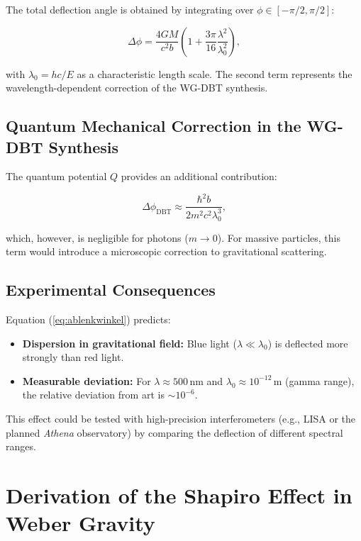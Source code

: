 The total deflection angle is obtained by integrating over $\phi \in [-\pi/2, \pi/2]$:

\begin{equation}
    \label{eq:ablenkwinkel}
    \boxed
    {
        \Delta \phi = \frac{4GM}{c^2 b} \left(1 + \frac{3\pi}{16} \frac{\lambda^2}{\lambda_0^2}\right),
    }
\end{equation}

with $\lambda_0 = hc/E$ as a characteristic length scale. The second term represents the wavelength-dependent correction of the WG-DBT synthesis.

\subsection{Quantum Mechanical Correction in the WG-DBT Synthesis}
The quantum potential $Q$ provides an additional contribution:

\begin{equation}
\Delta \phi_{\text{DBT}} \approx \frac{\hbar^2 b}{2m^2 c^2 \lambda_0^3},
\end{equation}

which, however, is negligible for photons ($m \to 0$). For massive particles, this term would introduce a microscopic correction to gravitational scattering.

\subsection{Experimental Consequences}
Equation (\ref{eq:ablenkwinkel}) predicts:
\begin{itemize}
\item \textbf{Dispersion in gravitational field:} Blue light ($\lambda \ll \lambda_0$) is deflected more strongly than red light.
\item \textbf{Measurable deviation:} For $\lambda \approx 500\,\text{nm}$ and $\lambda_0 \approx 10^{-12}\,\text{m}$ (gamma range), the relative deviation from \gls{art} is $\sim 10^{-6}$.
\end{itemize}

This effect could be tested with high-precision interferometers (e.g., LISA or the planned \textit{Athena} observatory) by comparing the deflection of different spectral ranges.

\section{Derivation of the Shapiro Effect in Weber Gravity}
\label{sec:shapiro_effect_wg_dbt}

